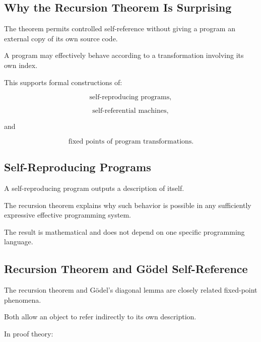 \subsection{Why the Recursion Theorem Is Surprising}
\label{subsec:why-recursion-theorem}

The theorem permits controlled self-reference without giving a program an
external copy of its own source code.

A program may effectively behave according to a transformation involving
its own index.

This supports formal constructions of:

\[
\boxed{
\text{self-reproducing programs},
}
\]

\[
\boxed{
\text{self-referential machines},
}
\]

and

\[
\boxed{
\text{fixed points of program transformations}.
}
\]

\subsection{Self-Reproducing Programs}
\label{subsec:self-reproducing-programs}

A self-reproducing program outputs a description of itself.

The recursion theorem explains why such behavior is possible in any
sufficiently expressive effective programming system.

The result is mathematical and does not depend on one specific programming
language.

\subsection{Recursion Theorem and Gödel Self-Reference}
\label{subsec:recursion-theorem-godel}

The recursion theorem and Gödel's diagonal lemma are closely related
fixed-point phenomena.

Both allow an object to refer indirectly to its own description.

In proof theory:

